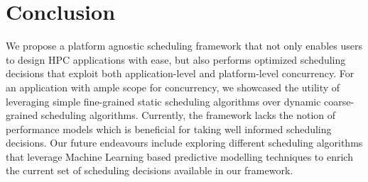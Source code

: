 
\chapter{Conclusion} %

\label{Chapter7} %



We propose a platform agnostic scheduling framework that not only enables users to design HPC applications with ease, but also performs optimized scheduling decisions that exploit both application-level and platform-level concurrency. For an application with ample scope for concurrency, we showcased the utility of leveraging simple fine-grained static scheduling algorithms over dynamic coarse-grained scheduling algorithms. Currently, the framework lacks the notion of performance models which is beneficial for taking well informed scheduling decisions. Our future endeavours include exploring different scheduling algorithms that leverage Machine Learning based predictive modelling techniques to enrich the current set of scheduling decisions available in our framework.